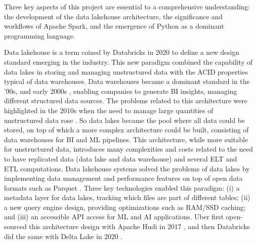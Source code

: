 Three key aspects of this project are essential to a comprehensive understanding: the development of the data lakehouse architecture, the significance and workflows of Apache Spark, and the emergence of Python as a dominant programming language.

Data lakehouse is a term coined by Databricks in 2020 \cite{WhatLakehouse2020} to define a new design standard emerging in the industry. This new paradigm combined the capability of data lakes in storing and managing unstructured data with the \gls{ACID} properties typical of data warehouses.
Data warehouses became a dominant standard in the '90s, and early 2000s \cite{chaudhuriOverviewDataWarehousing1997}, enabling companies to generate \gls{BI} insights, managing different structured data sources. The problems related to this architecture were highlighted in the 2010s when the need to manage large quantities of unstructured data rose \cite{ederUnstructuredData802008}. 
So data lakes became the pool where all data could be stored, on top of which a more complex architecture could be built, consisting of data warehouses for \gls{BI} and \gls{ML} pipelines.
This architecture, while more suitable for unstructured data, introduces many complexities and costs related to the need to have replicated data (data lake and data warehouse) and several \gls{ELT} and \gls{ETL} computations.
Data lakehouse systems solved the problems of data lakes by implementing data management and performance features on top of open data formats such as Parquet \cite{DremelMadeSimple}. Three key technologies enabled this paradigm: (i) a metadata layer for data lakes, tracking which files are part of different tables; (ii) a new query engine design, providing optimizations such as \gls{RAM}/\gls{SSD} caching; and (iii) an accessible \gls{API} access for \gls{ML} and \gls{AI} applications. Uber first open-sourced this architecture design with Apache Hudi in 2017 \cite{rajaperumalUberEngineeringIncremental2017}, and then Databricks did the same with Delta Lake in 2020 \cite{armbrustDeltaLakeHighperformance2020}.

